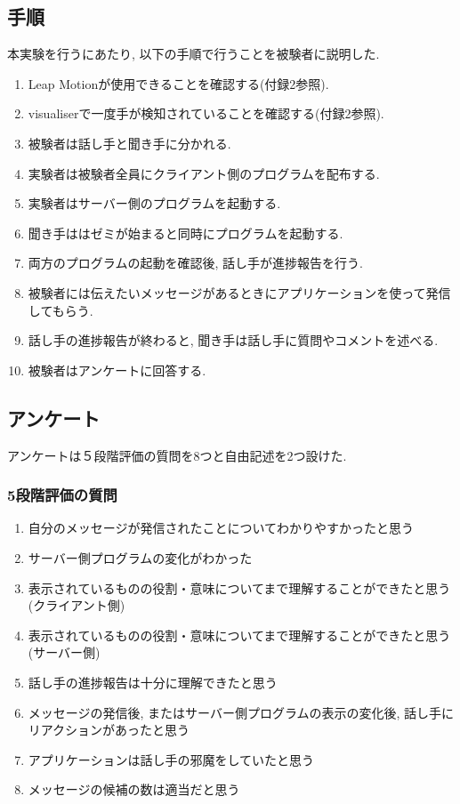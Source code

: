 \documentclass{funthesis}
\begin{document}
\subsection{手順}
本実験を行うにあたり, 以下の手順で行うことを被験者に説明した.  

\begin{enumerate}
 \item Leap Motionが使用できることを確認する(付録2参照).
 \item visualiserで一度手が検知されていることを確認する(付録2参照).
 \item 被験者は話し手と聞き手に分かれる. 
 \item 実験者は被験者全員にクライアント側のプログラムを配布する.
 \item 実験者はサーバー側のプログラムを起動する. 
 \item 聞き手ははゼミが始まると同時にプログラムを起動する. 
 \item 両方のプログラムの起動を確認後, 話し手が進捗報告を行う. 
 \item 被験者には伝えたいメッセージがあるときにアプリケーションを使って発信してもらう.
 \item 話し手の進捗報告が終わると, 聞き手は話し手に質問やコメントを述べる.
 \item 被験者はアンケートに回答する.
\end{enumerate}

\subsection{アンケート}
アンケートは５段階評価の質問を8つと自由記述を2つ設けた. \\
\subsubsection{5段階評価の質問}
\begin{enumerate}
 \item 自分のメッセージが発信されたことについてわかりやすかったと思う
 \item サーバー側プログラムの変化がわかった
 \item 表示されているものの役割・意味についてまで理解することができたと思う(クライアント側) 
 \item 表示されているものの役割・意味についてまで理解することができたと思う(サーバー側)
 \item 話し手の進捗報告は十分に理解できたと思う 
 \item メッセージの発信後, またはサーバー側プログラムの表示の変化後, 話し手にリアクションがあったと思う
 \item アプリケーションは話し手の邪魔をしていたと思う
 \item メッセージの候補の数は適当だと思う
\end{enumerate}
\end{document}
